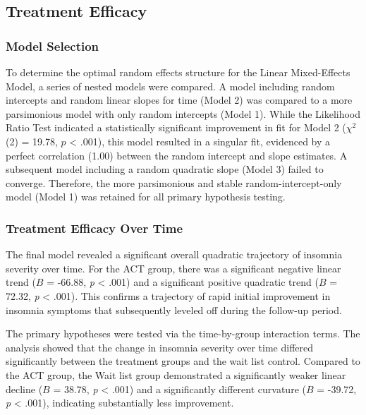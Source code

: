 \documentclass[
  man]{apa6}
\begin{document}
\subsection{Treatment Efficacy}\label{treatment-efficacy-1}

\subsubsection{Model Selection}\label{model-selection}

To determine the optimal random effects structure for the Linear Mixed-Effects Model, a series of nested models were compared. A model including random intercepts and random linear slopes for time (Model 2) was compared to a more parsimonious model with only random intercepts (Model 1). While the Likelihood Ratio Test indicated a statistically significant improvement in fit for Model 2 (\(\chi^2\)(2) = 19.78, \(p\) \textless{} .001), this model resulted in a singular fit, evidenced by a perfect correlation (1.00) between the random intercept and slope estimates. A subsequent model including a random quadratic slope (Model 3) failed to converge. Therefore, the more parsimonious and stable random-intercept-only model (Model 1) was retained for all primary hypothesis testing.

\subsubsection{Treatment Efficacy Over Time}\label{treatment-efficacy-over-time}

The final model revealed a significant overall quadratic trajectory of insomnia severity over time. For the ACT group, there was a significant negative linear trend (\(B\) = -66.88, \emph{p} \textless{} .001) and a significant positive quadratic trend (\(B\) = 72.32, \emph{p} \textless{} .001). This confirms a trajectory of rapid initial improvement in insomnia symptoms that subsequently leveled off during the follow-up period.

The primary hypotheses were tested via the time-by-group interaction terms. The analysis showed that the change in insomnia severity over time differed significantly between the treatment groups and the wait list control. Compared to the ACT group, the Wait list group demonstrated a significantly weaker linear decline (\(B\) = 38.78, \emph{p} \textless{} .001) and a significantly different curvature (\(B\) = -39.72, \emph{p} \textless{} .001), indicating substantially less improvement.
\end{document}
